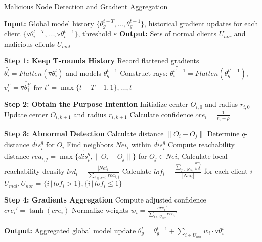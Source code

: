 \documentclass[lettersize,journal]{IEEEtran}
\begin{document}
\begin{algorithm}
\caption{Malicious Node Detection and Gradient Aggregation}
\label{alg:malicious-node-detection-history}
\begin{algorithmic}[1]
\State \textbf{Input:} Global model history $\{\theta_g^{t-T}, \dots, \theta_g^{t-1}\}$, historical gradient updates for each client $\{\triangledown \theta_{i}^{t-T}, \dots, \triangledown \theta_{i}^{t-1}\}$, threshold $\varepsilon$
\State \textbf{Output:} Sets of normal clients $U_{nor}$ and malicious clients $U_{mal}$

\State \textbf{Step 1: Keep T-rounds History}
    \State Record flattened gradients $\bar{\theta_i^t} = Flatten(\triangledown \theta_{i}^t)$ and models $\theta_g^{t-1}$
    \State Construct rays: $\widetilde{\theta_{i}^{t'-1}} = Flatten(\theta_g^{t'-1})$, ${v}_{i}^{t'} = \overline{\triangledown\theta_{i}^{t'}}$ for $t' = \max\{t-T+1, 1\}, \ldots, t$
\EndFor

\State \textbf{Step 2: Obtain the Purpose Intention}
    \State Initialize center $O_{i,0}$ and radius $r_{i,0}$
        \State Update center $O_{i,k+1}$ and radius $r_{i,k+1}$
    \EndWhile
    \State Calculate confidence $cre_i = \frac{1}{r_i + \rho}$
\EndFor

\State \textbf{Step 3: Abnormal Detection}
        \State Calculate distance $\|O_i - O_j\|$
    \EndFor
    \State Determine $q$-distance $\widetilde{dis_i^q}$ for $O_i$
    \State Find neighbors $Nei_i$ within $\widetilde{dis_i^q}$
    \State Compute reachability distance $rea_{i,j} = \max\{\widetilde{dis_i^q}, \|O_i - O_j\|\}$ for $O_j \in Nei_i$
    \State Calculate local reachability density $lrd_i = \frac{|Nei_i|}{\sum_{j \in Nei_i} rea_{i,j}}$
\EndFor
\State Calculate $lof_i = \frac{\sum_{j \in Nei_i} \frac{lrd_j}{lrd_i}}{|Nei_i|}$ for each client $i$
\State $U_{mal}, U_{nor} = \{i \,|\, lof_i > 1\}, \{i \,|\, lof_i \leq 1\}$

\State \textbf{Step 4: Gradients Aggregation}
        \State Compute adjusted confidence $cre_i' = \tanh(cre_i)$
        \State Normalize weights $w_i = \frac{cre_i'}{\sum_{i \in U_{nor}} cre_i'}$
\EndFor

\State \textbf{Output:} Aggregated global model update $\theta_g^t = \theta_g^{t-1} + \sum_{i \in U_{nor}} w_i \cdot \triangledown \theta_i^t$
\end{algorithmic}
\end{algorithm}
\end{document}
